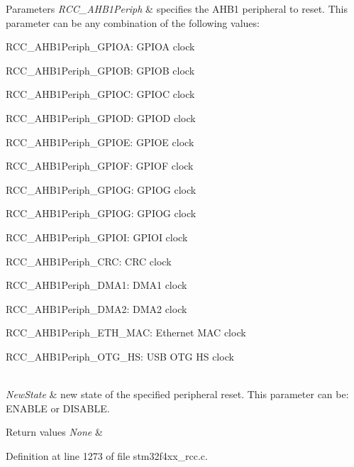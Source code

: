 \begin{DoxyParams}{Parameters}
{\em R\+C\+C\+\_\+\+A\+H\+B1\+Periph} & specifies the A\+H\+B1 peripheral to reset. This parameter can be any combination of the following values\+: \begin{DoxyItemize}
\item R\+C\+C\+\_\+\+A\+H\+B1\+Periph\+\_\+\+G\+P\+I\+OA\+: G\+P\+I\+OA clock \item R\+C\+C\+\_\+\+A\+H\+B1\+Periph\+\_\+\+G\+P\+I\+OB\+: G\+P\+I\+OB clock \item R\+C\+C\+\_\+\+A\+H\+B1\+Periph\+\_\+\+G\+P\+I\+OC\+: G\+P\+I\+OC clock \item R\+C\+C\+\_\+\+A\+H\+B1\+Periph\+\_\+\+G\+P\+I\+OD\+: G\+P\+I\+OD clock \item R\+C\+C\+\_\+\+A\+H\+B1\+Periph\+\_\+\+G\+P\+I\+OE\+: G\+P\+I\+OE clock \item R\+C\+C\+\_\+\+A\+H\+B1\+Periph\+\_\+\+G\+P\+I\+OF\+: G\+P\+I\+OF clock \item R\+C\+C\+\_\+\+A\+H\+B1\+Periph\+\_\+\+G\+P\+I\+OG\+: G\+P\+I\+OG clock \item R\+C\+C\+\_\+\+A\+H\+B1\+Periph\+\_\+\+G\+P\+I\+OG\+: G\+P\+I\+OG clock \item R\+C\+C\+\_\+\+A\+H\+B1\+Periph\+\_\+\+G\+P\+I\+OI\+: G\+P\+I\+OI clock \item R\+C\+C\+\_\+\+A\+H\+B1\+Periph\+\_\+\+C\+RC\+: C\+RC clock \item R\+C\+C\+\_\+\+A\+H\+B1\+Periph\+\_\+\+D\+M\+A1\+: D\+M\+A1 clock \item R\+C\+C\+\_\+\+A\+H\+B1\+Periph\+\_\+\+D\+M\+A2\+: D\+M\+A2 clock \item R\+C\+C\+\_\+\+A\+H\+B1\+Periph\+\_\+\+E\+T\+H\+\_\+\+M\+AC\+: Ethernet M\+AC clock \item R\+C\+C\+\_\+\+A\+H\+B1\+Periph\+\_\+\+O\+T\+G\+\_\+\+HS\+: U\+SB O\+TG HS clock\end{DoxyItemize}
\\
\hline
{\em New\+State} & new state of the specified peripheral reset. This parameter can be\+: E\+N\+A\+B\+LE or D\+I\+S\+A\+B\+LE. \\
\hline
\end{DoxyParams}

\begin{DoxyRetVals}{Return values}
{\em None} & \\
\hline
\end{DoxyRetVals}


Definition at line 1273 of file stm32f4xx\+\_\+rcc.\+c.

